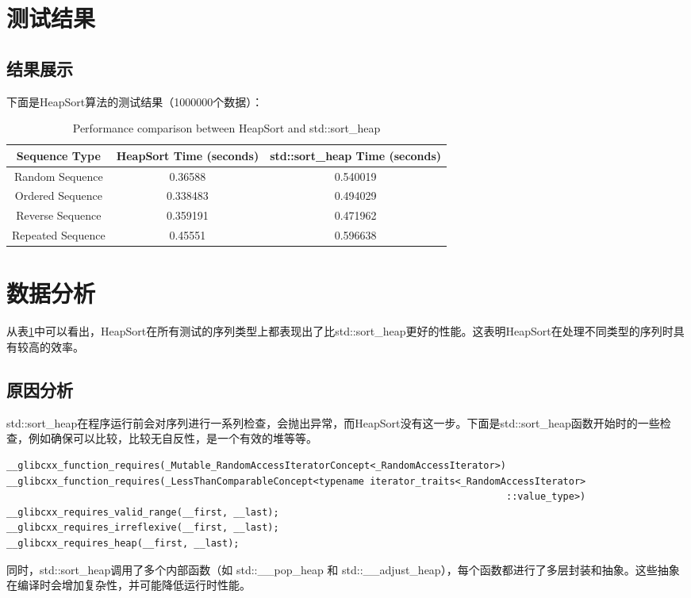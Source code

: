 \documentclass[UTF8]{ctexart}
\begin{document}
\section{测试结果}
\subsection{结果展示}
下面是HeapSort算法的测试结果（1000000个数据）：
\begin{table}[H]
    \centering
    \begin{tabular}{|c|c|c|}
        \hline
        Sequence Type & HeapSort Time (seconds) & std::sort\_heap Time (seconds) \\
        \hline
        Random Sequence & 0.36588 & 0.540019 \\
        \hline
        Ordered Sequence & 0.338483 & 0.494029 \\
        \hline
        Reverse Sequence & 0.359191 & 0.471962 \\
        \hline
        Repeated Sequence & 0.45551 & 0.596638 \\
        \hline
    \end{tabular}
    \caption{Performance comparison between HeapSort and std::sort\_heap}
    \label{tab:performance}
\end{table}
\section{数据分析}

从表\ref{tab:performance}中可以看出，HeapSort在所有测试的序列类型上都表现出了比std::sort\_heap更好的性能。这表明HeapSort在处理不同类型的序列时具有较高的效率。

\subsection{原因分析}
std::sort\_heap在程序运行前会对序列进行一系列检查，会抛出异常，而HeapSort没有这一步。下面是std::sort\_heap函数开始时的一些检查，例如确保可以比较，比较无自反性，是一个有效的堆等等。
\begin{lstlisting}
__glibcxx_function_requires(_Mutable_RandomAccessIteratorConcept<_RandomAccessIterator>)
__glibcxx_function_requires(_LessThanComparableConcept<typename iterator_traits<_RandomAccessIterator>
                                                                                        ::value_type>)
__glibcxx_requires_valid_range(__first, __last);
__glibcxx_requires_irreflexive(__first, __last);
__glibcxx_requires_heap(__first, __last);
\end{lstlisting}

同时，std::sort\_heap调用了多个内部函数（如 std::\_\_pop\_heap 和 std::\_\_adjust\_heap），每个函数都进行了多层封装和抽象。这些抽象在编译时会增加复杂性，并可能降低运行时性能。
\end{document}
